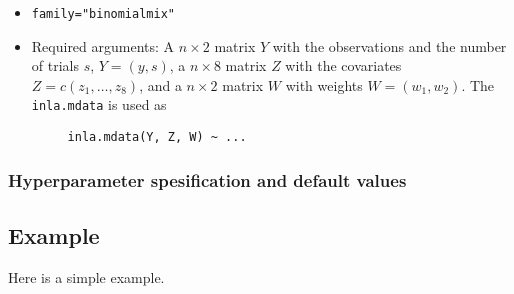 \documentclass[a4paper,11pt]{article}
\begin{document}
\begin{itemize}
\item \texttt{family="binomialmix"}
\item Required arguments: A $n\times 2$ matrix $Y$ with the
observations and the number of trials $s$,  $Y=(y, s)$,
    a $n\times 8$ matrix $Z$ with the covariates $Z=c(z_1, \ldots, z_8)$,
    and a $n\times 2$ matrix $W$ with weights $W=(w_1, w_2)$. The
    \texttt{inla.mdata} is used as
\begin{verbatim}
     inla.mdata(Y, Z, W) ~ ...
\end{verbatim}
\end{itemize}


\clearpage
\subsubsection*{Hyperparameter spesification and default values}
{\small }

\clearpage
\subsection*{Example}
Here is a simple example.

{\small }
\end{document}
